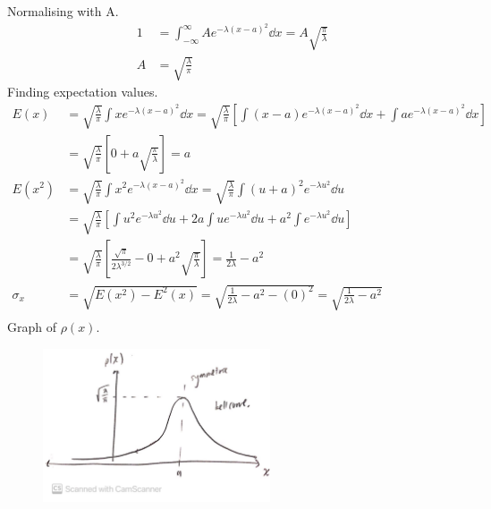 \documentclass[newpage]{homework}
\begin{document}
\maketitle

\question
Normalising with A.
\begin{align*}
    1   &=  \int_{-\infty}^{\infty} Ae^{-\lambda(x-a)^2} \dd{x}
    =	A \sqrt{\frac{\pi}{\lambda}}	\\
    A   &=  \boxed{\sqrt{\frac{\lambda}{\pi}}}
\end{align*}
Finding expectation values.
\begin{align*}
    E(x)	&=	\sqrt{\frac{\lambda}{\pi}}  \int xe^{-\lambda(x-a)^2} \dd{x}
    =  \sqrt{\frac{\lambda}{\pi}}  \left[ \int (x-a)e^{-\lambda(x-a)^2} \dd{x} + \int ae^{-\lambda(x-a)^2} \dd{x} \right]  \\
    &=	\sqrt{\frac{\lambda}{\pi}}  \left[ 0 +  a\sqrt{\frac{\pi}{\lambda}}    \right]
    =	\boxed{a}  \\
    E(x^2)  &=  \sqrt{\frac{\lambda}{\pi}}  \int x^2 e^{-\lambda(x-a)^2} \dd{x}
    =	\sqrt{\frac{\lambda}{\pi}}  \int (u+a)^2 e^{-\lambda u^2} \dd{u}	\\
    &=	\sqrt{\frac{\lambda}{\pi}}  \left[  \int u^2 e^{-\lambda u^2} \dd{u} + 2a \int u e^{-\lambda u^2} \dd{u} + a^2 \int e^{-\lambda u^2} \dd{u} \right] \\
    &=	\sqrt{\frac{\lambda}{\pi}}  \left[  \frac{\sqrt{\pi}}{2\lambda^{3/2}} - 0 + a^2 \sqrt{\frac{\pi}{\lambda}} \right]
    =	\boxed{\frac{1}{2\lambda} - a^2}   \\
    \sigma_x  &=  \sqrt{E(x^2) - E^2(x)}
    =	\sqrt{\frac{1}{2\lambda} - a^2 - (0)^2}
    =	\boxed{\sqrt{\frac{1}{2\lambda} - a^2}}	\\
\end{align*}
Graph of $\rho(x)$.
\begin{figure}[htbp]
    \centering
    \includegraphics[width=0.6\textwidth]{1c.jpg}
\end{figure}
\end{document}
